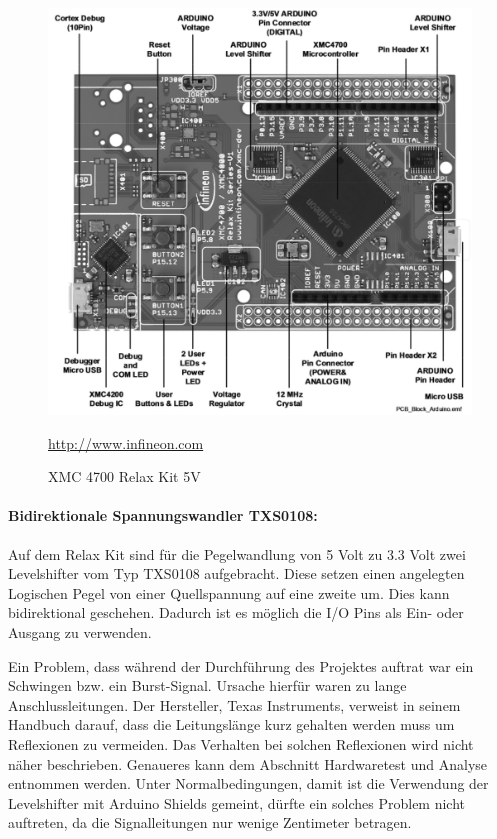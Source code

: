 \begin{figure}[h]
	\centering
	\includegraphics[width=\textwidth-6cm]{hardware/graphics/XMC_4700_Board_overview}
	\caption{XMC 4700 Relax Kit 5V}
	\quelle \url{http://www.infineon.com}
	\label{fig:XMC4700}	
\end{figure}

\paragraph{Bidirektionale Spannungswandler TXS0108:}
Auf dem Relax Kit sind für die Pegelwandlung von 5 Volt zu 3.3 Volt zwei Levelshifter vom Typ TXS0108 aufgebracht.
Diese setzen einen angelegten Logischen Pegel von einer Quellspannung auf eine zweite um.
Dies kann bidirektional geschehen.
Dadurch ist es möglich die I/O Pins als Ein- oder Ausgang zu verwenden.

Ein Problem, dass während der Durchführung des Projektes auftrat war ein Schwingen bzw. ein Burst-Signal. 
Ursache hierfür waren zu lange Anschlussleitungen.
Der Hersteller, Texas Instruments, verweist in seinem Handbuch darauf, dass die Leitungslänge kurz gehalten werden muss um Reflexionen zu vermeiden.
Das Verhalten bei solchen Reflexionen wird nicht näher beschrieben.
Genaueres kann dem Abschnitt Hardwaretest und Analyse entnommen werden.
Unter Normalbedingungen, damit ist die Verwendung der Levelshifter mit Arduino Shields gemeint, dürfte ein solches Problem nicht auftreten, da die Signalleitungen nur wenige Zentimeter betragen.

